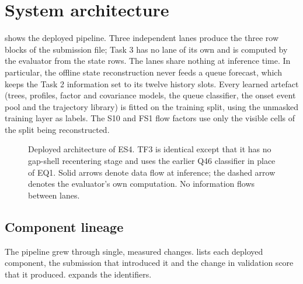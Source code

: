 \section{System architecture}\label{sec:architecture}

 shows the deployed pipeline. Three independent lanes produce the three row blocks of the
submission file; Task 3 has no lane of its own and is computed by the evaluator from the state rows. The lanes share
nothing at inference time. In particular, the offline state reconstruction never feeds a queue forecast, which keeps
the Task 2 information set to its twelve history slots. Every learned artefact (trees, profiles, factor and covariance
models, the queue classifier, the onset event pool and the trajectory library) is fitted on the training split,
using the unmasked training layer as labels. The S10 and FS1 flow factors use only the visible cells of the split
being reconstructed.

\begin{figure}[t!]
\centering

\caption{Deployed architecture of ES4. TF3 is identical except that it has no gap-shell recentering stage and uses
the earlier Q46 classifier in place of EQ1. Solid arrows denote data flow at inference; the dashed arrow denotes the
evaluator's own computation. No information flows between lanes.}\label{fig:architecture}
\end{figure}

\subsection{Component lineage}
The pipeline grew through single, measured changes.  lists each deployed component, the submission
that introduced it and the change in validation score that it produced.  expands the identifiers.

